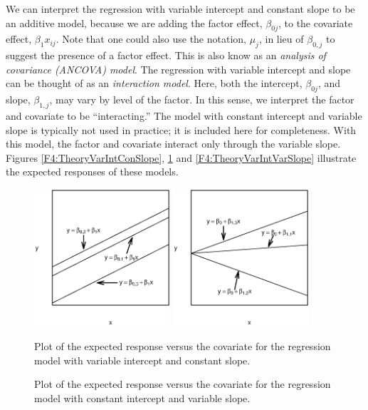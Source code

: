 We can interpret the regression with variable intercept and constant
slope to be an additive model, because we are adding the factor
effect, $\beta_{0j}$, to the covariate effect, $\beta_1x_{ij}$. Note
that one could also use the notation, $\mu_j$, in lieu of $\beta
_{0,j}$ to suggest the presence of a factor effect. This is also
know as an \emph{analysis of covariance (ANCOVA) model}. The
regression with variable intercept and slope can be thought of as an
\emph{interaction model}. Here, both the intercept, $\beta_{0j}$,
and slope, $\beta_{1,j}$, may vary by level of the factor. In this
sense, we interpret the factor and covariate to be ``interacting.''
The model with constant intercept and variable slope is typically
not used in practice; it is included here for completeness. With
this model, the factor and covariate interact only through the
variable slope. Figures \ref{F4:TheoryVarIntConSlope},
\ref{F4:TheoryConIntVarSlope} and \ref{F4:TheoryVarIntVarSlope}
illustrate the expected responses of these models.



\begin{figure}[htp]
  \begin{center}
    \includegraphics[width=0.45\textwidth]{Chapter4/F4TheoryVarIntConSlope.eps}
    \includegraphics[width=0.45\textwidth]{Chapter4/F4TheoryConIntVarSlope.eps}
    \hfill  $~~~$
     \parbox[t]{2.5in}{\caption{\label{F4:TheoryVarIntConSlope} \small  Plot of the expected response versus the covariate for the regression model
with variable intercept and constant slope.}} \hfill
    \parbox[t]{2.5in}{\caption{\label{F4:TheoryConIntVarSlope} \small  Plot of the expected response versus the covariate for the regression model
with constant intercept and variable slope.}}
  \end{center}
\end{figure}


